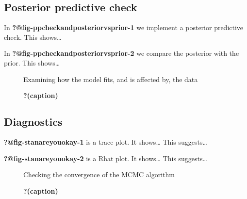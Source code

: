 \documentclass[
  letterpaper,
  DIV=11,
  numbers=noendperiod]{scrartcl}
\begin{document}
\hypertarget{posterior-predictive-check}{%
\subsection{Posterior predictive
check}\label{posterior-predictive-check}}

In \textbf{?@fig-ppcheckandposteriorvsprior-1} we implement a posterior
predictive check. This shows\ldots{}

In \textbf{?@fig-ppcheckandposteriorvsprior-2} we compare the posterior
with the prior. This shows\ldots{}

\begin{figure}

\begin{minipage}[t]{0.50\linewidth}

{\centering 

Examining how the model fits, and is affected by, the data

}

\end{minipage}%

\caption{\label{fig-ppcheckandposteriorvsprior}\textbf{?(caption)}}

\end{figure}

\hypertarget{diagnostics}{%
\subsection{Diagnostics}\label{diagnostics}}

\textbf{?@fig-stanareyouokay-1} is a trace plot. It shows\ldots{} This
suggests\ldots{}

\textbf{?@fig-stanareyouokay-2} is a Rhat plot. It shows\ldots{} This
suggests\ldots{}

\begin{figure}

\begin{minipage}[t]{0.50\linewidth}

{\centering 

Checking the convergence of the MCMC algorithm

}

\end{minipage}%

\caption{\label{fig-stanareyouokay}\textbf{?(caption)}}

\end{figure}
\end{document}
